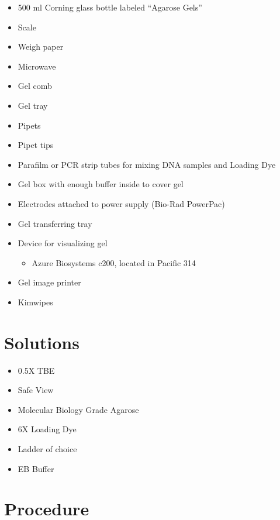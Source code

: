 \documentclass[
  letterpaper,
  DIV=11,
  numbers=noendperiod]{scrreprt}
\providecommand{\tightlist}{%
  \setlength{\itemsep}{0pt}\setlength{\parskip}{0pt}}\usepackage{longtable,booktabs,array}
\begin{document}
\begin{itemize}
\tightlist
\item
  500 ml Corning glass bottle labeled ``Agarose Gels''
\item
  Scale
\item
  Weigh paper
\item
  Microwave
\item
  Gel comb
\item
  Gel tray
\item
  Pipets
\item
  Pipet tips
\item
  Parafilm or PCR strip tubes for mixing DNA samples and Loading Dye
\item
  Gel box with enough buffer inside to cover gel
\item
  Electrodes attached to power supply (Bio-Rad PowerPac)
\item
  Gel transferring tray
\item
  Device for visualizing gel

  \begin{itemize}
  \tightlist
  \item
    Azure Biosystems c200, located in Pacific 314
  \end{itemize}
\item
  Gel image printer
\item
  Kimwipes
\end{itemize}

\hypertarget{solutions-5}{%
\section{Solutions}\label{solutions-5}}

\begin{itemize}
\tightlist
\item
  0.5X TBE
\item
  Safe View
\item
  Molecular Biology Grade Agarose
\item
  6X Loading Dye
\item
  Ladder of choice
\item
  EB Buffer
\end{itemize}

\hypertarget{procedure-5}{%
\section{Procedure}\label{procedure-5}}
\end{document}
